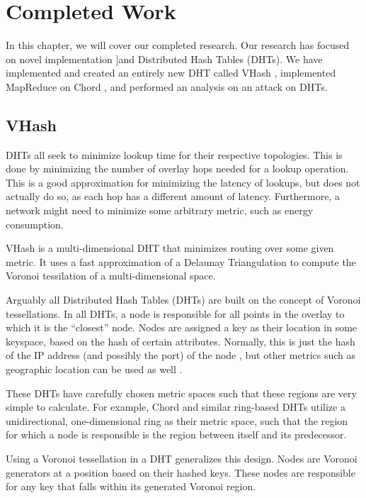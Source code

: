 \chapter{Completed Work}
\label{chapter:prev}

In this chapter, we will cover our completed research.
Our research has focused on novel implementation ]and Distributed Hash Tables (DHTs).
We have implemented and created an entirely new DHT called VHash \cite{vhash}, implemented MapReduce on Chord \cite{chordreduce}, and performed an analysis on an attack on DHTs.


\section{VHash}
DHTs all seek to minimize lookup time for their respective topologies.
This is done by minimizing the number of overlay hops needed for a lookup operation.
This is a good approximation for minimizing the latency of lookups, but does not actually do so, as each hop has a different amount of latency.
Furthermore, a network might need to minimize some arbitrary metric, such as energy consumption.

VHash is a multi-dimensional DHT that minimizes routing over some given metric.
It uses a fast approximation of a Delaunay Triangulation to compute the Voronoi tessilation of a multi-dimensional space.



Arguably all Distributed Hash Tables (DHTs) are built on the concept of Voronoi tessellations.
In all DHTs, a node is responsible for all points in the overlay to which it is the ``closest'' node.
Nodes are assigned a key as their location in some keyspace, based on the hash of certain attributes.
Normally, this is just the hash of the IP address (and possibly the port) of the node \cite{chord} \cite{kademlia} \cite{can} \cite{pastry}, but other metrics such as geographic location can be used as well \cite{ratnasamy2002ght}.

These DHTs have carefully chosen metric spaces such that these regions are very simple to calculate.
For example, Chord \cite{chord} and similar ring-based DHTs \cite{symphony} utilize a unidirectional, one-dimensional ring as their metric space, such that the region for which a node is responsible is the region between itself and its predecessor.

Using a Voronoi tessellation in a DHT generalizes this design.
Nodes are Voronoi generators at a position based on their hashed keys.
These nodes are responsible for any key that falls within its generated Voronoi region.

